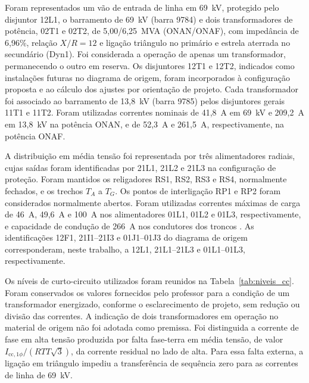 Foram representados um vão de entrada de linha em 69~kV, protegido pelo disjuntor 12L1, o barramento de 69~kV (barra 9784) e dois transformadores de potência, 02T1 e 02T2, de 5,00/6,25~MVA (ONAN/ONAF), com impedância de 6,96\%, relação $X/R = 12$ e ligação triângulo no primário e estrela aterrada no secundário (Dyn1). Foi considerada a operação de apenas um transformador, permanecendo o outro em reserva. Os disjuntores 12T1 e 12T2, indicados como instalações futuras no diagrama de origem, foram incorporados à configuração proposta e ao cálculo dos ajustes por orientação de projeto. Cada transformador foi associado ao barramento de 13,8~kV (barra 9785) pelos disjuntores gerais 11T1 e 11T2. Foram utilizadas correntes nominais de 41,8~A em 69~kV e 209,2~A em 13,8~kV na potência ONAN, e de 52,3~A e 261,5~A, respectivamente, na potência ONAF.

A distribuição em média tensão foi representada por três alimentadores radiais, cujas saídas foram identificadas por 21L1, 21L2 e 21L3 na configuração de proteção. Foram mantidos os religadores RS1, RS2, RS3 e RS4, normalmente fechados, e os trechos $T_A$ a $T_G$. Os pontos de interligação RP1 e RP2 foram considerados normalmente abertos. Foram utilizadas correntes máximas de carga de 46~A, 49,6~A e 100~A nos alimentadores 01L1, 01L2 e 01L3, respectivamente, e capacidade de condução de 266~A nos condutores dos troncos \cite{sampaio2026roteiro}. As identificações 12F1, 21I1--21I3 e 01J1--01J3 do diagrama de origem corresponderam, neste trabalho, a 12L1, 21L1--21L3 e 01L1--01L3, respectivamente.

Os níveis de curto-circuito utilizados foram reunidos na Tabela~\ref{tab:niveis_cc}. Foram conservados os valores fornecidos pelo professor para a condição de um transformador energizado, conforme o esclarecimento de projeto, sem redução ou divisão das correntes. A indicação de dois transformadores em operação no material de origem não foi adotada como premissa. Foi distinguida a corrente de fase em alta tensão produzida por falta fase-terra em média tensão, de valor $I_{\mathrm{cc},1\phi}/(RTT\sqrt{3})$, da corrente residual no lado de alta. Para essa falta externa, a ligação em triângulo impediu a transferência de sequência zero para as correntes de linha de 69~kV.

